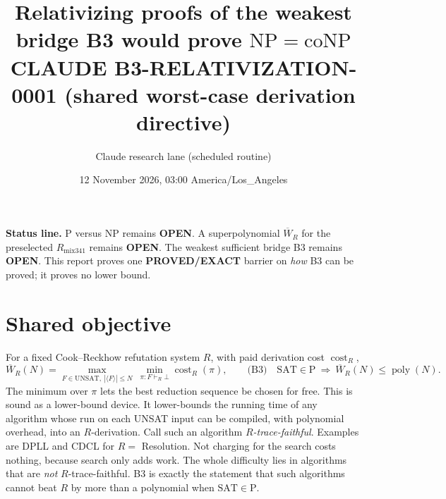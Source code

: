 \documentclass[11pt]{article}
\title{Relativizing proofs of the weakest bridge B3 would prove $\mathrm{NP}=\mathrm{coNP}$\\
\large CLAUDE B3-RELATIVIZATION-0001 (shared worst-case derivation directive)}
\author{Claude research lane (scheduled routine)}
\date{12 November 2026, 03:00 America/Los\_Angeles}
\newcommand{\W}{\overline W}
\begin{document}
\maketitle

\noindent\textbf{Status line.} P versus NP remains \textbf{OPEN}. A superpolynomial
$\W_{R}$ for the preselected $R_{\mathrm{mix341}}$ remains \textbf{OPEN}. The weakest
sufficient bridge B3 remains \textbf{OPEN}. This report proves one
\textbf{PROVED/EXACT} barrier on \emph{how} B3 can be proved; it proves no lower bound.

\section{Shared objective}
For a fixed Cook--Reckhow refutation system $R$, with paid derivation cost
$\operatorname{cost}_R$,
\[
\W_R(N)=\max_{F\in\mathrm{UNSAT},\ |\langle F\rangle|\le N}\ \min_{\pi:F\vdash_R\bot}\operatorname{cost}_R(\pi),
\qquad
\text{(B3)}\quad \mathrm{SAT}\in\mathrm P\ \Longrightarrow\ \W_R(N)\le \operatorname{poly}(N).
\]
The minimum over $\pi$ lets the best reduction sequence be chosen for free. This is
sound as a lower-bound device. It lower-bounds the running time of any algorithm
whose run on each UNSAT input can be compiled, with polynomial overhead, into an
$R$-derivation. Call such an algorithm \emph{$R$-trace-faithful}. Examples are DPLL and CDCL
for $R=$ Resolution. Not charging for the search costs nothing, because
search only adds work. The whole difficulty lies in algorithms that are \emph{not}
$R$-trace-faithful. B3 is exactly the statement that such algorithms cannot
beat $R$ by more than a polynomial when $\mathrm{SAT}\in\mathrm P$.
\end{document}
